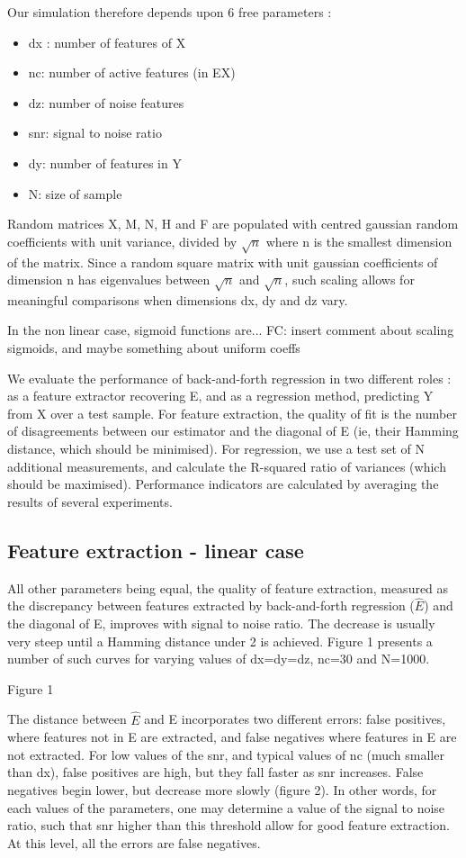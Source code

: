 \documentclass{article}
\begin{document}
Our simulation therefore depends upon 6 free parameters :
\begin{itemize}
\item dx : number of features of X
\item nc: number of active features (in EX)
\item dz: number of noise features
\item snr: signal to noise ratio
\item dy: number of features in Y
\item N: size of sample
\end{itemize}

Random matrices X, M, N, H and F are populated with centred gaussian random coefficients with unit variance, divided by $ \surd n$ where n is the smallest dimension of the matrix.
%
Since a random square matrix with unit gaussian coefficients of dimension n has eigenvalues between $ \surd n $ and $\surd n $, such  scaling allows for meaningful comparisons when dimensions dx, dy and dz vary.

In the non linear case, sigmoid functions are...
FC: insert comment about scaling sigmoids, and maybe something about uniform coeffs

We evaluate the performance of back-and-forth regression in two different roles : as a feature extractor recovering E, and as a regression method, predicting Y from X over a test sample.
%
For feature extraction, the quality of fit is the number of disagreements between our estimator and the diagonal of E (ie, their Hamming distance, which should be minimised).
%
For regression, we use a test set of N additional measurements, and calculate the R-squared ratio of variances (which should be maximised).
%
Performance indicators are calculated by averaging the results of several experiments.

\subsection{Feature extraction - linear case}
All other parameters being equal, the quality of feature extraction, measured as the discrepancy between features extracted by back-and-forth regression ($\hat E$) and the diagonal of E, improves with signal to noise ratio.
%
The decrease is usually very steep until a Hamming distance under 2 is achieved.
%
Figure 1 presents a number of such curves for varying values of dx=dy=dz, nc=30 and N=1000.

Figure 1

The distance between $\hat E$ and E incorporates two different errors: false positives, where features not in E are extracted, and false negatives where features in E are not extracted.
%
For low values of the snr, and typical values of nc (much smaller than dx), false positives are high, but they fall faster as snr increases.
%
False negatives begin lower, but decrease more slowly (figure 2).
%
In other words, for each values of the parameters, one may determine a value of the signal to noise ratio, such that snr higher than this threshold allow for good feature extraction.
%
At this level, all the errors are false negatives.
\end{document}
